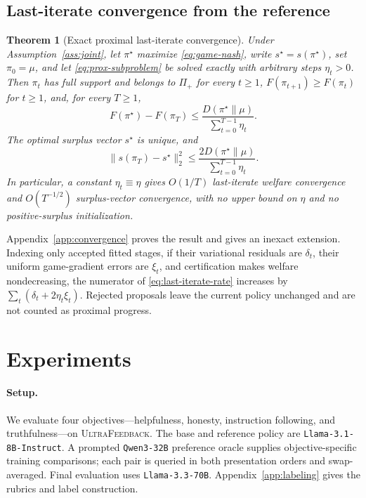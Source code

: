 \documentclass{article}
\newtheorem{theorem}{Theorem}
\theoremstyle{remark}
\theoremstyle{plain}
\begin{document}
\subsection{Last-iterate convergence from the reference}
\begin{theorem}[Exact proximal last-iterate convergence]
\label{thm:last-iterate}
Under Assumption~\ref{ass:joint}, let $\pi^\star$ maximize \eqref{eq:game-nash}, write $s^\star=s(\pi^\star)$, set $\pi_0=\mu$, and let \eqref{eq:prox-subproblem} be solved exactly with arbitrary steps $\eta_t>0$. Then $\pi_t$ has full support and belongs to $\Pi_+$ for every $t\ge1$, $F(\pi_{t+1})\ge F(\pi_t)$ for $t\ge1$, and, for every $T\ge1$,
\begin{equation}
F(\pi^\star)-F(\pi_T)
\le
\frac{D(\pi^\star\|\mu)}{\sum_{t=0}^{T-1}\eta_t}.
\label{eq:last-iterate-rate}
\end{equation}
The optimal surplus vector $s^\star$ is unique, and
\begin{equation}
\|s(\pi_T)-s^\star\|_2^2
\le
\frac{2D(\pi^\star\|\mu)}{\sum_{t=0}^{T-1}\eta_t}.
\label{eq:last-iterate-surplus}
\end{equation}
In particular, a constant $\eta_t\equiv\eta$ gives $O(1/T)$ last-iterate welfare convergence and $O(T^{-1/2})$ surplus-vector convergence, with no upper bound on $\eta$ and no positive-surplus initialization.
\end{theorem}
Appendix~\ref{app:convergence} proves the result and gives an inexact extension. Indexing only accepted fitted stages, if their variational residuals are $\delta_t$, their uniform game-gradient errors are $\xi_t$, and certification makes welfare nondecreasing, the numerator of \eqref{eq:last-iterate-rate} increases by $\sum_t(\delta_t+2\eta_t\xi_t)$. Rejected proposals leave the current policy unchanged and are not counted as proximal progress.

\section{Experiments}
\label{sec:experiments}
\paragraph{Setup.}
We evaluate four objectives---helpfulness, honesty, instruction following, and truthfulness---on \textsc{UltraFeedback}. The base and reference policy are \texttt{Llama-3.1-8B-Instruct}. A prompted \texttt{Qwen3-32B} preference oracle supplies objective-specific training comparisons; each pair is queried in both presentation orders and swap-averaged. Final evaluation uses \texttt{Llama-3.3-70B}. Appendix~\ref{app:labeling} gives the rubrics and label construction.
\end{document}

